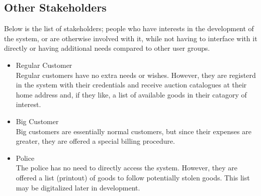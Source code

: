 \subsection{Other Stakeholders}
Below is the list of stakeholders; people who have interests in the development of the system, or are otherwise involved with it, while not having to interface with it directly or having additional needs compared to other user groups.
\begin{itemize}[noitemsep]
	\item Regular Customer\\
		Regular customers have no extra needs or wishes. However, they are registerd in the system with their credentials and receive auction catalogues at their home address and, if they like, a list of available goods in their catagory of interest.
	\item Big Customer\\
		Big customers are essentially normal customers, but since their expenses are greater, they are offered a special billing procedure.
	\item Police\\
		The police has no need to directly access the system. However, they are offered a list (printout) of goods to follow potentially stolen goods. This list may be digitalized later in development.
\end{itemize}

